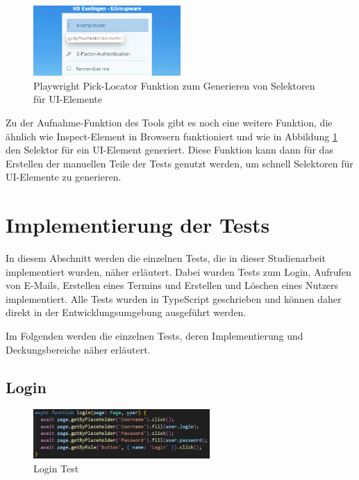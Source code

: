 \begin{figure}[H]
    \centering
    \includegraphics[width=0.5\textwidth]{images/Playwright_PickLocator.png}
    \caption{Playwright Pick-Locator Funktion zum Generieren von Selektoren für UI-Elemente}
    \label{fig:playwright-pick-locator}
\end{figure}

Zu der Aufnahme-Funktion des Tools gibt es noch eine weitere Funktion, die ähnlich wie Inspect-Element in Browsern funktioniert und wie in Abbildung \ref{fig:playwright-pick-locator} den Selektor für ein UI-Element generiert.
Diese Funktion kann dann für das Erstellen der manuellen Teile der Tests genutzt werden, um schnell Selektoren für UI-Elemente zu generieren.



\section{Implementierung der Tests}

In diesem Abschnitt werden die einzelnen Tests, die in dieser Studienarbeit implementiert wurden, näher erläutert.
Dabei wurden Tests zum Login, Aufrufen von E-Mails, Erstellen eines Termins und Erstellen und Löschen eines Nutzers implementiert.
Alle Tests wurden in TypeScript geschrieben und können daher direkt in der Entwicklungsumgebung ausgeführt werden.

Im Folgenden werden die einzelnen Tests, deren Implementierung und Deckungsbereiche näher erläutert.
\newpage
\subsection*{Login}

\begin{figure}[H]
    \centering
    \includegraphics[width=0.6\textwidth]{images/LoginTest.png}
    \caption{Login Test}
    \label{fig:login-test}
\end{figure}

